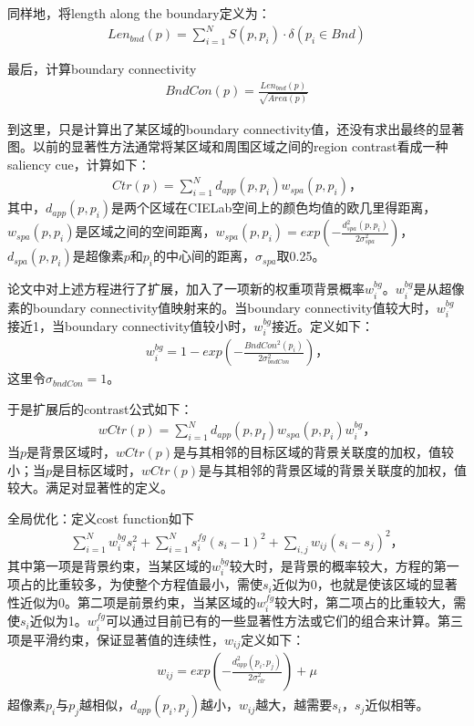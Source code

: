 \documentclass[12pt]{article}
\begin{document}
同样地，将length along the boundary定义为：
\begin{align}
Len_{bnd}(p) = \sum_{i=1}^N S(p, p_i) \cdot \delta(p_i \in Bnd)
\end{align}

最后，计算boundary connectivity
\begin{align}
BndCon(p) = \frac{Len_{bnd}(p)}{\sqrt{Area(p)}}
\end{align}

到这里，只是计算出了某区域的boundary connectivity值，还没有求出最终的显著图。以前的显著性方法通常将某区域和周围区域之间的region contrast看成一种saliency cue，计算如下：
\begin{align}
Ctr(p) = \sum_{i=1}^{N}d_{app}(p, p_i)w_{spa}(p, p_i)，
\end{align}
其中，$d_{app}(p, p_i)$是两个区域在CIELab空间上的颜色均值的欧几里得距离，$w_{spa}(p, p_i)$是区域之间的空间距离，$w_{spa}(p, p_i) = exp(-\frac{d_{spa}^2(p, p_i)}{2\sigma_{spa}^2})$，$d_{spa}(p, p_i)$是超像素$p$和$p_i$的中心间的距离，$\sigma_{spa}$取0.25。

论文中对上述方程进行了扩展，加入了一项新的权重项背景概率$w_i^{bg}$。$w_i^{bg}$是从超像素的boundary connectivity值映射来的。当boundary connectivity值较大时，$w_i^{bg}$接近1，当boundary connectivity值较小时，$w_i^{bg}$接近。定义如下：
\begin{align}
w_i^{bg} = 1-exp(-\frac{BndCon^2(p_i)}{2\sigma_{bndCon}^2})，
\end{align}
这里令$\sigma_{bndCon}=1$。

于是扩展后的contrast公式如下：
\begin{align}
wCtr(p) = \sum_{i=1}^{N}d_{app}(p, p_I)w_{spa}(p, p_i)w_i^{bg}，
\end{align}
当$p$是背景区域时，$wCtr(p)$是与其相邻的目标区域的背景关联度的加权，值较小；当$p$是目标区域时，$wCtr(p)$是与其相邻的背景区域的背景关联度的加权，值较大。满足对显著性的定义。

全局优化：定义cost function如下
\begin{align}
\sum_{i=1}^{N}w_i^{bg}s_i^2+\sum_{i=1}^{N}s_i^{fg}(s_i-1)^2+\sum_{i, j}w_{ij}(s_i-s_j)^2，
\end{align}
其中第一项是背景约束，当某区域的$w_i^{bg}$较大时，是背景的概率较大，方程的第一项占的比重较多，为使整个方程值最小，需使$s_i$近似为0，也就是使该区域的显著性近似为0。第二项是前景约束，当某区域的$w_i^{fg}$较大时，第二项占的比重较大，需使$s_i$近似为1。$w_i^{fg}$可以通过目前已有的一些显著性方法或它们的组合来计算。第三项是平滑约束，保证显著值的连续性，$w_{ij}$定义如下：
\begin{align}
w_{ij} = exp(-\frac{d_{app}^2(p_i, p_j)}{2\sigma_{clr}^2})+\mu
\end{align}
超像素$p_i$与$p_j$越相似，$d_{app}(p_i, p_j)$越小，$w_{ij} $越大，越需要$s_i$，$s_j$近似相等。
\end{document}

